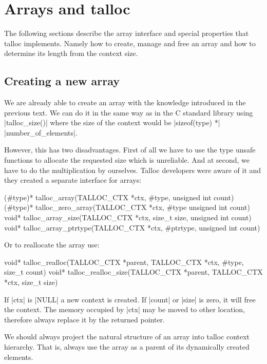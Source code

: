 \section{Arrays and talloc}
\label{talloc:sec:arrays}

The following sections describe the array interface and special properties that
talloc implements. Namely how to create, manage and free an array and how to
determine its length from the context size.

\subsection{Creating a new array}

We are already able to create an array with the knowledge introduced in the
previous text. We can do it in the same way as in the C standard library using
|talloc_size()| where the size of the context would be |sizeof(type) *|
|number_of_elements|.

However, this has two disadvantages. First of all we have to use the type unsafe
functions to allocate the requested size which is unreliable. And at second,
we have to do the multiplication by ourselves. Talloc developers were aware of
it and they created a separate interface for arrays:

\begin{funcproto}
(#type)* talloc_array(TALLOC_CTX *ctx, #type,
                      unsigned int count)
(#type)* talloc_zero_array(TALLOC_CTX *ctx, #type
                           unsigned int count)
void* talloc_array_size(TALLOC_CTX *ctx, size_t size,
                        unsigned int count)
void* talloc_array_ptrtype(TALLOC_CTX *ctx, #ptrtype,
                           unsigned int count)
\end{funcproto}
\funclistend
Or to reallocate the array use:

\begin{funcproto}
void* talloc_realloc(TALLOC_CTX *parent,
                     TALLOC_CTX *ctx,
                     #type, size_t count)
void* talloc_realloc_size(TALLOC_CTX *parent,
                          TALLOC_CTX *ctx,
                          size_t size)
\end{funcproto}
\begin{funcdesc}
If |ctx| is |NULL| a new context is created. If |count| or |size| is zero, it
will free the context. The memory occupied by |ctx| may be moved to other
location, therefore always replace it by the returned pointer.
\end{funcdesc}
\funclistend
We should always project the natural structure of an array into talloc context
hierarchy. That is, always use the array as a parent of its dynamically created
elements.


